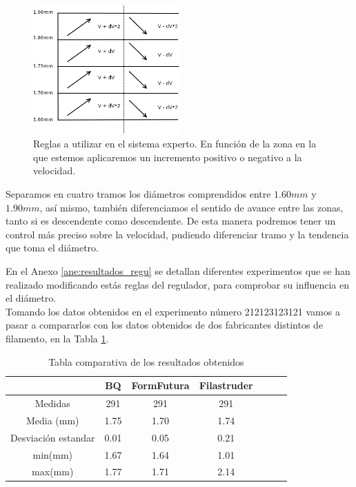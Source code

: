\begin{figure}[H]
    \centering
    \includegraphics[width=0.5\textwidth]{images/producciones/11082015/Diagram1.png}
    \caption[Reglas a utilizar en el sistema experto.]{Reglas a utilizar en el sistema experto. En función de la zona en la que estemos aplicaremos un incremento positivo o negativo a la velocidad.}
    \label{fig:reg_reglas}
\end{figure}

Separamos en cuatro tramos los diámetros comprendidos entre $1.60mm$ y $1.90mm$, así mismo, también diferenciamos el sentido de avance entre las zonas, tanto si es descendente como descendente. De esta manera podremos tener un control más preciso sobre la velocidad, pudiendo diferenciar tramo y la tendencia que toma el diámetro.

En el Anexo \ref{ane:resultados_regu} se detallan diferentes experimentos que se han realizado modificando estás reglas del regulador, para comprobar su influencia en el diámetro.\\

Tomando los datos obtenidos en el experimento número 212123123121  vamos a pasar a compararlos con los datos obtenidos de dos fabricantes distintos de filamento, en la Tabla \ref{tab:compara_results}.

\begin{table}[H]
	\centering
	\begin{tabular}{ccccccc}
		                    & BQ & FormFutura & Filastruder \\ \hline
		Medidas             & 291      &291       & 291      \\
		Media (mm)          & 1.75     & 1.70     & 1.74      \\
		Desviación estandar & 0.01     & 0.05     & 0.21      \\
		min(mm)             & 1.67     & 1.64     & 1.01      \\
		max(mm)             & 1.77     & 1.71     & 2.14     
	\end{tabular}
	\caption{Tabla comparativa de los resultados obtenidos}
	\label{tab:compara_results}
\end{table}

